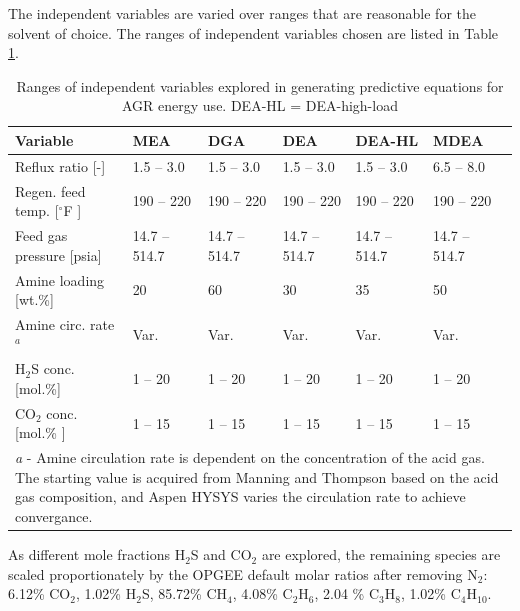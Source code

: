 \documentclass[11pt]{report}
\begin{document}
The independent variables are varied over ranges that are reasonable for the solvent of choice.  The ranges of independent variables chosen are listed in Table \ref{tab:AGR_Aspen_Variable_Ranges}.

\begin{table}
\begin{scriptsize}
\caption{Ranges of independent variables explored in generating predictive equations for AGR energy use. DEA-HL = DEA-high-load}
\label{tab:AGR_Aspen_Variable_Ranges}
\begin{tabular*}{1\columnwidth}{p{}p{}p{}p{}p{}p{}}
\toprule
Variable & MEA & DGA & DEA & DEA-HL & MDEA\\
\midrule
Reflux ratio [-]				&	1.5 -- 3.0				&	1.5 -- 3.0				& 	1.5 -- 3.0				&	1.5 -- 3.0 			& 6.5 -- 8.0  		 \\
Regen. feed temp. [$^\circ$F ] 	&	190 -- 220 	 		&	190 -- 220 	 		&	190 -- 220 	 		& 190 -- 220 		 	& 190 -- 220 	 	\\
Feed gas pressure  [psia]		&	14.7 -- 514.7 	 		&	14.7 -- 514.7 	 		&	14.7 -- 514.7 	  		& 14.7 -- 514.7 	  		& 14.7 -- 514.7 	 	 \\
Amine loading 	[wt.\%]		&	20 					&	60 	 				&	30 					& 35 	 				& 50 				 \\
Amine circ. rate$^a$ 			&	Var. 					&	Var. 				 	&	Var. 			 		& Var. 				& Var. 			 \\
H$_2$S conc. [mol.\%]		&	1 -- 20 				&	1 -- 20 	 			&	1 -- 20 				& 1 -- 20 				& 1 -- 20 			 \\
CO$_2$ conc. [mol.\% ] 		&	1 -- 15 	 			&	1 -- 15 	 			&	1 -- 15 	  			& 1 -- 15 	 			& 1 -- 15 	 		 \\
\bottomrule
\multicolumn{6}{p{0.9\columnwidth}}{\emph{a} - Amine circulation rate is dependent on the concentration of the acid gas. The starting value is acquired from Manning and Thompson \cite{Manning1991} based on the acid gas composition, and Aspen HYSYS varies the circulation rate to achieve convergance.}\\
\end{tabular*}
\end{scriptsize}
\end{table}


As different mole fractions H$_2$S and CO$_2$ are explored, the remaining species are scaled proportionately by the OPGEE default molar ratios after removing N$_2$: 6.12\% CO$_2$, 1.02\% H$_2$S, 85.72\% CH$_4$, 4.08\% C$_2$H$_6$, 2.04 \% C$_3$H$_8$, 1.02\% C$_4$H$_10$.  
\end{document}
